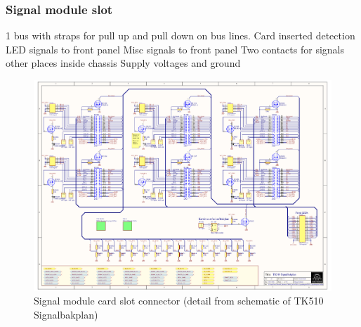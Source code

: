 \subsubsection{Signal module slot}
1 bus with straps for pull up and pull down on bus lines.
Card inserted detection
LED signals to front panel
Misc signals to front panel
Two contacts for signals other places inside chassis
Supply voltages and ground

\begin{figure}[h]
    \centering
    \includegraphics[trim={4.1cm 14.3cm 21.2cm 3.3cm},clip,width=\textwidth]{img/TK510_Signalbakplan.pdf}
    \caption{Signal module card slot connector (detail from schematic of TK510 Signalbakplan)}
    \label{fig:signalmodulslot}
\end{figure}